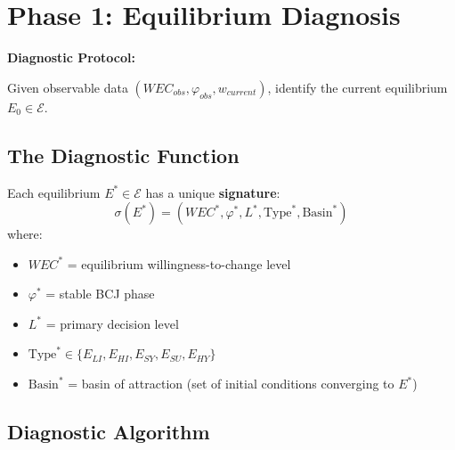 \section{Phase 1: Equilibrium Diagnosis}
\label{sec:meq-diagnosis}

\begin{tcolorbox}[colback=green!5!white, colframe=green!75!black,
    title=Question 1: Where Are We Now?]

\textbf{Diagnostic Protocol:}

Given observable data $(WEC_{obs}, \varphi_{obs}, w_{current})$, identify the
current equilibrium $E_0 \in \mathcal{E}$.

\end{tcolorbox}

\subsection{The Diagnostic Function}

\begin{definition}
Each equilibrium $E^* \in \mathcal{E}$ has a unique \textbf{signature}:
\begin{equation}
\sigma(E^*) = \left( WEC^*, \varphi^*, L^*, \text{Type}^*, \text{Basin}^* \right)
\end{equation}
where:
\begin{itemize}[nosep]
    \item $WEC^*$ = equilibrium willingness-to-change level
    \item $\varphi^*$ = stable BCJ phase
    \item $L^*$ = primary decision level
    \item $\text{Type}^* \in \{E_{LI}, E_{HI}, E_{SY}, E_{SU}, E_{HY}\}$
    \item $\text{Basin}^*$ = basin of attraction (set of initial conditions converging to $E^*$)
\end{itemize}
\end{definition}

\subsection{Diagnostic Algorithm}

